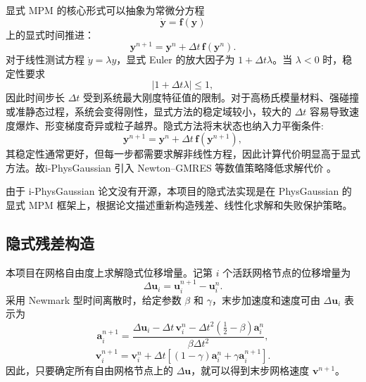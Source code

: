 \documentclass[a4paper]{article}
\begin{document}
显式 MPM 的核心形式可以抽象为常微分方程
\[
    \dot{\bm{y}}=\bm{f}(\bm{y})
\]
上的显式时间推进：
\[
    \bm{y}^{n+1}
    =
    \bm{y}^{n}
    +
    \Delta t\,\bm{f}(\bm{y}^{n}).
\]
对于线性测试方程 $\dot{y}=\lambda y$，显式 Euler 的放大因子为 $1+\Delta t\lambda$。当 $\lambda<0$ 时，稳定性要求
\[
    |1+\Delta t\lambda|\leq 1,
\]
因此时间步长 $\Delta t$ 受到系统最大刚度特征值的限制。对于高杨氏模量材料、强碰撞或准静态过程，系统会变得刚性，显式方法的稳定域较小，较大的 $\Delta t$ 容易导致速度爆炸、形变梯度奇异或粒子越界。隐式方法将末状态也纳入力平衡条件:
\[
    \bm{y}^{n+1}
    =
    \bm{y}^{n}
    +
    \Delta t\,\bm{f}(\bm{y}^{n+1}),
\]
其稳定性通常更好，但每一步都需要求解非线性方程，因此计算代价明显高于显式方法。故i-PhysGaussian 引入 Newton--GMRES 等数值策略降低求解代价 \cite{cao2026iphysgaussian}。

由于 i-PhysGaussian 论文没有开源，本项目的隐式法实现是在 PhysGaussian 的显式 MPM 框架上，根据论文描述重新构造残差、线性化求解和失败保护策略。

\subsection{隐式残差构造}

本项目在网格自由度上求解隐式位移增量。记第 $i$ 个活跃网格节点的位移增量为
\[
    \Delta \bm{u}_i
    =
    \bm{u}_i^{n+1}-\bm{u}_i^n.
\]
采用 Newmark 型时间离散时，给定参数 $\beta$ 和 $\gamma$，末步加速度和速度可由 $\Delta \bm{u}_i$ 表示为
\[
    \bm{a}_i^{n+1}
    =
    \frac{
        \Delta \bm{u}_i
        -
        \Delta t\,\bm{v}_i^n
        -
        \Delta t^2
        \left(
            \frac{1}{2}-\beta
        \right)
        \bm{a}_i^n
    }{
        \beta\Delta t^2
    },
\]
\[
    \bm{v}_i^{n+1}
    =
    \bm{v}_i^n
    +
    \Delta t
    \left[
        (1-\gamma)\bm{a}_i^n
        +
        \gamma\bm{a}_i^{n+1}
    \right].
\]
因此，只要确定所有自由网格节点上的 $\Delta \bm{u}$，就可以得到末步网格速度 $\bm{v}^{n+1}$。
\end{document}
